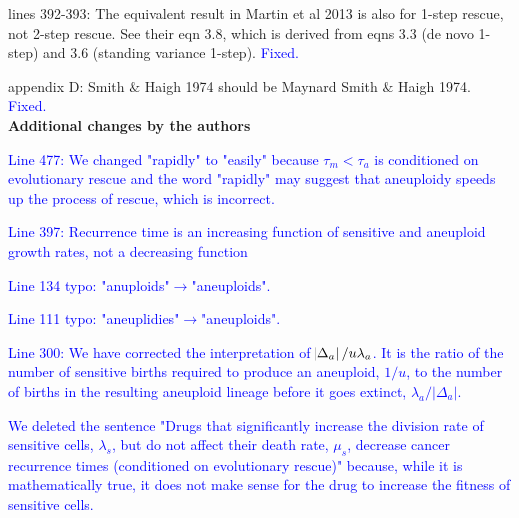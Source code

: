 \documentclass[12pt]{extarticle}
\begin{document}
lines 392-393: The equivalent result in Martin et al 2013 is also for 1-step rescue, not 2-step rescue. See their eqn 3.8, which is derived from eqns 3.3 (de novo 1-step) and 3.6 (standing variance 1-step).
\textcolor{blue}{Fixed.}

appendix D: Smith $\&$ Haigh 1974 should be Maynard Smith $\&$ Haigh 1974.
\textcolor{blue}{Fixed.}
\\

\textbf{Additional changes by the authors}

\textcolor{blue}{Line 477: We changed "rapidly" to "easily" because $\tau_m<\tau_a$ is conditioned on evolutionary rescue and the word "rapidly" may suggest that aneuploidy speeds up the process of rescue, which is incorrect. }%

\textcolor{blue}{Line 397: Recurrence time is an increasing function of sensitive and aneuploid growth rates, not a decreasing function}%

\textcolor{blue}{Line 134 typo: "anuploids"$\rightarrow$"aneuploids".} %

\textcolor{blue}{Line 111 typo: "aneuplidies"$\rightarrow$"aneuploids".}%

\textcolor{blue}{Line 300: We have corrected the interpretation of $\abs{\Delta_a}/u\lambda_a$. It is the ratio of the number of sensitive births required to produce an aneuploid, $1/u$, to the number of births in the resulting aneuploid lineage before it goes extinct, $\lambda_a / |\Delta_a|$.}%

\textcolor{blue}{We deleted the sentence "Drugs that significantly increase the division rate of sensitive cells, $\lambda_s$, but do not affect their death rate, $\mu_s$, decrease cancer recurrence times (conditioned on evolutionary rescue)" because, while it is mathematically true, it does not make sense for the drug to increase the fitness of sensitive cells.}%






%
%
\end{document}
